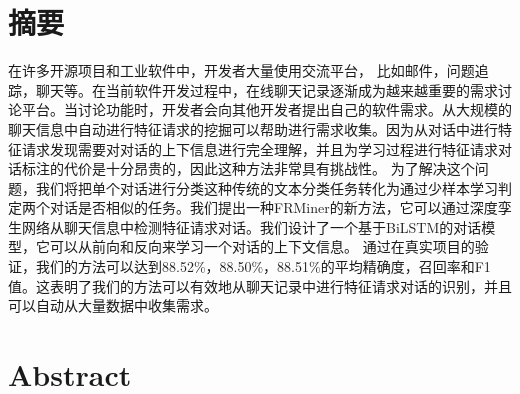 \maketitle%
\MAKETITLE%
\makedeclaration%
\intobmk\chapter*{摘\quad 要}%
\setcounter{page}{1}%

在许多开源项目和工业软件中，开发者大量使用交流平台， 比如邮件，问题追踪，聊天等。在当前软件开发过程中，在线聊天记录逐渐成为越来越重要的需求讨论平台。当讨论功能时，开发者会向其他开发者提出自己的软件需求。从大规模的
聊天信息中自动进行特征请求的挖掘可以帮助进行需求收集。因为从对话中进行特征请求发现需要对对话的上下信息进行完全理解，并且为学习过程进行特征请求对话标注的代价是十分昂贵的，因此这种方法非常具有挑战性。
为了解决这个问题，我们将把单个对话进行分类这种传统的文本分类任务转化为通过少样本学习判定两个对话是否相似的任务。我们提出一种FRMiner的新方法，它可以通过深度孪生网络从聊天信息中检测特征请求对话。我们设计了一个基于BiLSTM的对话模型，它可以从前向和反向来学习一个对话的上下文信息。
通过在真实项目的验证，我们的方法可以达到88.52\%，88.50\%，88.51\%的平均精确度，召回率和F1值。这表明了我们的方法可以有效地从聊天记录中进行特征请求对话的识别，并且可以自动从大量数据中收集需求。

\intobmk\chapter*{Abstract}%


